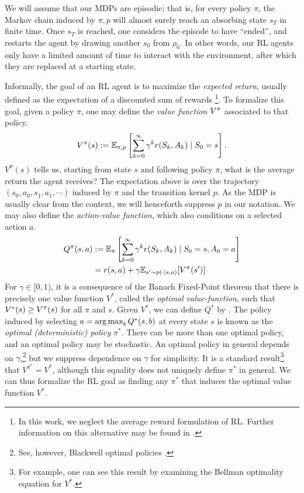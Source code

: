 \documentclass[\main/thesis.tex]{subfiles}
\begin{document}
We will assume that our MDPs are episodic; that is, for every policy $\pi$, the Markov chain induced by $\pi, p$ will almost surely reach an absorbing state $s_T$ in finite time. Once $s_T$ is reached, one considers the episode to have ``ended'', and restarts the agent by drawing another $s_0$ from $\rho_0$.  In other words, our RL agents only have a limited amount of time to interact with the environment, after which they are replaced at a starting state.

Informally, the goal of an RL agent is to maximize the \textit{expected return}, usually defined as the expectation of a discounted sum of rewards \footnote{In this work, we neglect the average reward formulation of RL. Further information on this alternative may be found in \citep{puterman2014markov}.}. To formalize this goal, given a policy $\pi$, one may define the \textit{value function} $V^\pi$ associated to that policy.
\begin{align*}
    V^\pi(s) := \mathbb{E}_{\pi, p}\left[\sum_{k = 0}^\infty \gamma^k r(S_k, A_k) \mid S_0 = s \right].
\end{align*}
$V^\pi(s)$ tells us, starting from state $s$ and following policy $\pi$, what is the average return the agent receives? The expectation above is over the trajectory $(s_0, a_0, s_1, a_1, \cdots)$ induced by $\pi$ and the transition kernel $p$. As the MDP is usually clear from the context, we will henceforth suppress $p$ in our notation. We may also define the \textit{action-value function}, which also conditions on a selected action $a$. 
\begin{align}
    Q^\pi(s, a) &:= \mathbb{E}_{\pi}\left[\sum_{k = 0}^\infty \gamma^k r(S_k, A_k) \mid S_0 = s, A_0 = a \right] \nonumber \\
    &= r(s, a) + \gamma \mathbb{E}_{s' \sim p(\cdot \mid s, a)}[V^\pi(s')] \label{eq:short-q-def}
\end{align}
For $\gamma \in [0, 1)$, it is a consequence of the Banach Fixed-Point theorem that there is precisely one value function $V^*$, called the \textit{optimal value-function}, such that $V^*(s) \geq V^\pi(s)$ for all $\pi$ and $s$. Given $V^*$, we can define $Q^*$ by . The policy induced by selecting $a = \operatorname*{arg\,max}_b Q^*(s, b)$ at every state $s$ is known as the \textit{optimal (deterministic) policy} $\pi^*$. There can be more than one optimal policy, and an optimal policy may be stochastic. An optimal policy in general depends on $\gamma$,\footnote{See, however, Blackwell optimal policies \citep{mahadevan1996average}.} but we suppress dependence on $\gamma$ for simplicity. It is a standard result\footnote{For example, one can see this result by examining the Bellman optimality equation for $V^*$.} that $V^{\pi^*} = V^*$, although this equality does not uniquely define $\pi^*$ in general. We can thus formalize the RL goal as finding any $\pi^*$ that induces the optimal value function $V^*$. 
\end{document}
